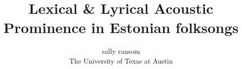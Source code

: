 \documentclass [11pt]{article}
\title{Lexical \& Lyrical Acoustic Prominence in Estonian folksongs}
\author{sally ransom\\The University of Texas at Austin}
\begin{document}
\maketitle
\nocite{*}


\end{document}
